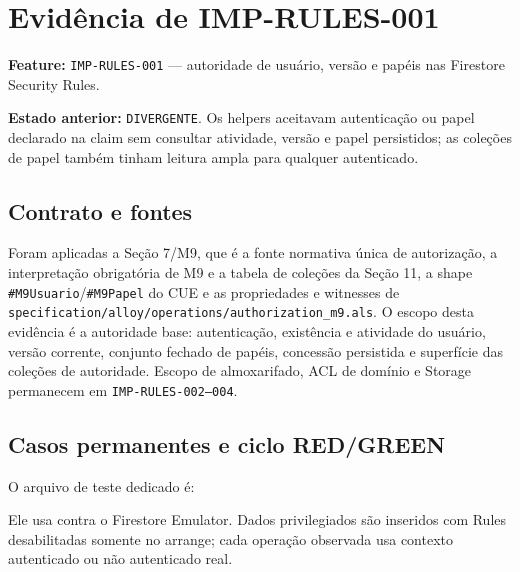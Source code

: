 \section{Evidência de IMP-RULES-001}

\textbf{Feature:} \texttt{IMP-RULES-001} --- autoridade de usuário, versão e
papéis nas Firestore Security Rules.

\textbf{Estado anterior:} \texttt{DIVERGENTE}. Os helpers aceitavam autenticação
ou papel declarado na claim sem consultar atividade, versão e papel persistidos;
as coleções de papel também tinham leitura ampla para qualquer autenticado.

\subsection{Contrato e fontes}

Foram aplicadas a Seção 7/M9, que é a fonte normativa única de autorização, a
interpretação obrigatória de M9 e a tabela de coleções da Seção 11, a shape
\texttt{\#M9Usuario}/\texttt{\#M9Papel} do CUE e as propriedades e witnesses de
\nolinkurl{specification/alloy/operations/authorization_m9.als}. O escopo desta
evidência é a autoridade base: autenticação, existência e atividade do usuário,
versão corrente, conjunto fechado de papéis, concessão persistida e superfície
das coleções de autoridade. Escopo de almoxarifado, ACL de domínio e Storage
permanecem em \texttt{IMP-RULES-002--004}.

\subsection{Casos permanentes e ciclo RED/GREEN}

O arquivo de teste dedicado é:

\begin{center}\small
{}
\end{center}

Ele usa  contra o Firestore Emulator. Dados
privilegiados são inseridos com Rules desabilitadas somente no arrange; cada
operação observada usa contexto autenticado ou não autenticado real.

